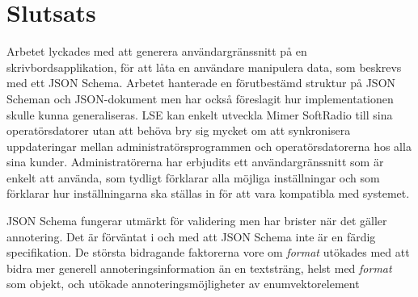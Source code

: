 \section{Slutsats}
\label{sec:slutsats:slutsats}
Arbetet lyckades med att generera användargränssnitt på en skrivbordsapplikation, för att låta en användare manipulera data, som beskrevs med ett JSON Schema. Arbetet hanterade en förutbestämd struktur på JSON Scheman och JSON-dokument men har också föreslagit hur implementationen skulle kunna generaliseras. LSE kan enkelt utveckla Mimer SoftRadio till sina operatörsdatorer utan att behöva bry sig mycket om att synkronisera uppdateringar mellan administratörsprogrammen och operatörsdatorerna hos alla sina kunder. Administratörerna har erbjudits ett användargränssnitt som är enkelt att använda, som tydligt förklarar alla möjliga inställningar och som förklarar hur inställningarna ska ställas in för att vara kompatibla med systemet.

JSON Schema fungerar utmärkt för validering men har brister när det gäller annotering. Det är förväntat i och med att JSON Schema inte är en färdig specifikation. De största bidragande faktorerna vore om \textit{format} utökades med att bidra mer generell annoteringsinformation än en textsträng, helst med \textit{format} som objekt, och utökade annoteringsmöjligheter av enumvektorelement